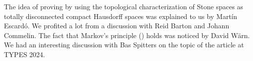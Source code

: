 The idea of proving  by using the topological characterization of Stone spaces as totally disconnected compact Hausdorff spaces was explained to us by Martín Escardó.
We profited a lot from a discussion with Reid Barton and Johann Commelin. 
The fact that Markov's principle () holds was noticed by David Wärn. 
We had an interesting discussion with Bas Spitters on the topic of the article at TYPES 2024.
